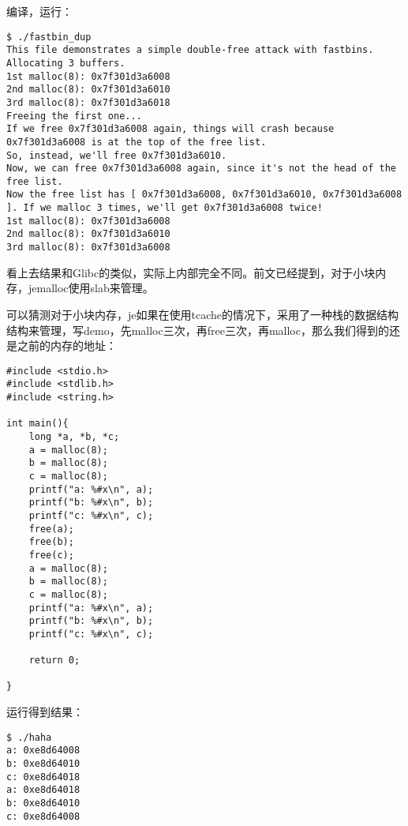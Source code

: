 编译，运行：
\begin{verbatim}
$ ./fastbin_dup
This file demonstrates a simple double-free attack with fastbins.
Allocating 3 buffers.
1st malloc(8): 0x7f301d3a6008
2nd malloc(8): 0x7f301d3a6010
3rd malloc(8): 0x7f301d3a6018
Freeing the first one...
If we free 0x7f301d3a6008 again, things will crash because 0x7f301d3a6008 is at the top of the free list.
So, instead, we'll free 0x7f301d3a6010.
Now, we can free 0x7f301d3a6008 again, since it's not the head of the free list.
Now the free list has [ 0x7f301d3a6008, 0x7f301d3a6010, 0x7f301d3a6008 ]. If we malloc 3 times, we'll get 0x7f301d3a6008 twice!
1st malloc(8): 0x7f301d3a6008
2nd malloc(8): 0x7f301d3a6010
3rd malloc(8): 0x7f301d3a6008

\end{verbatim}

看上去结果和Glibc的类似，实际上内部完全不同。前文已经提到，对于小块内存，jemalloc使用slab来管理。

可以猜测对于小块内存，je如果在使用tcache的情况下，采用了一种栈的数据结构结构来管理，写demo，先malloc三次，再free三次，再malloc，那么我们得到的还是之前的内存的地址：
\begin{verbatim}
#include <stdio.h>
#include <stdlib.h>
#include <string.h>

int main(){
    long *a, *b, *c;
    a = malloc(8);
    b = malloc(8);
    c = malloc(8);
    printf("a: %#x\n", a);
    printf("b: %#x\n", b);
    printf("c: %#x\n", c);
    free(a);
    free(b);
    free(c);
    a = malloc(8);
    b = malloc(8);
    c = malloc(8);
    printf("a: %#x\n", a);
    printf("b: %#x\n", b);
    printf("c: %#x\n", c);

    return 0;

}

\end{verbatim}

运行得到结果：
\begin{verbatim}
$ ./haha       
a: 0xe8d64008
b: 0xe8d64010
c: 0xe8d64018
a: 0xe8d64018
b: 0xe8d64010
c: 0xe8d64008

\end{verbatim}

